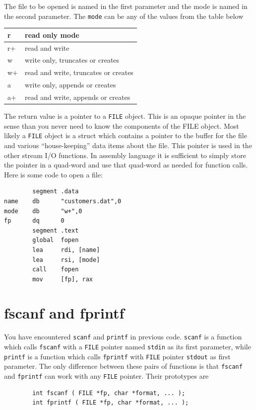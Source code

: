 \documentclass[11pt,b5paper]{book}
\begin{document}
The file to be opened is named in the first parameter and the mode is named in the second parameter.
The {\tt mode} can be any of the values from the table below
\begin{center}
    \begin{tabular}{|l|l|}
        \hline
        r  & read only mode \\
        \hline 
        r+ & read and write \\
        \hline
        w  & write only, truncates or creates \\
        \hline
        w+ & read and write, truncates or creates \\
        \hline
        a  & write only, appends or creates \\
        \hline
        a+ & read and write, appends or creates \\
        \hline
    \end{tabular}
\end{center}

The return value is a pointer to a {\tt FILE} object.
This is an opaque pointer in the sense than you never need to know the components of the FILE object.
Most likely a {\tt FILE} object is a struct which contains a pointer to the buffer for the file and
various ``house-keeping'' data items about the file.
This pointer is used in the other stream I/O functions.
In assembly language it is sufficient to simply store the pointer in a quad-word and use that
quad-word as needed for function calls.
Here is some code to open a file:
\begin{verbatim}
        segment .data
name    db      "customers.dat",0
mode    db      "w+",0
fp      dq      0
        segment .text
        global  fopen
        lea     rdi, [name]
        lea     rsi, [mode]
        call    fopen
        mov     [fp], rax
\end{verbatim}

\section{fscanf and fprintf}

You have encountered {\tt scanf} and {\tt printf} in previous code.
{\tt scanf} is a function which calls {\tt fscanf} with a {\tt FILE} pointer named {\tt stdin} as its
first parameter, while {\tt printf} is a function which calls {\tt fprintf} with {\tt FILE} pointer
{\tt stdout} as first parameter.
The only difference between these pairs of functions is that {\tt fscanf} and {\tt fprintf}
can work with any {\tt FILE} pointer.
Their prototypes are
\begin{verbatim}
        int fscanf ( FILE *fp, char *format, ... );
        int fprintf ( FILE *fp, char *format, ... );
\end{verbatim}
\end{document}
